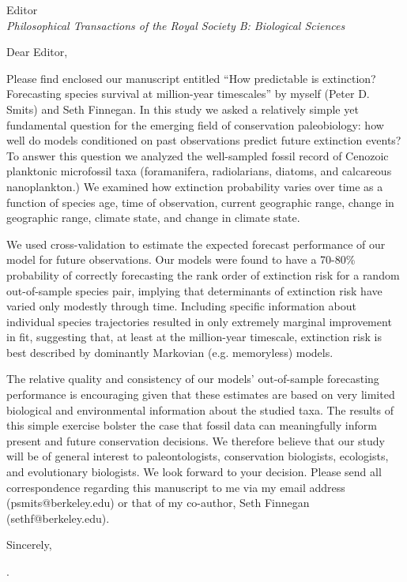 \documentclass{letter}
\begin{document}
\begin{letter}{Editor \\ \textit{Philosophical Transactions of the Royal Society B: Biological Sciences}}
  \opening{Dear Editor,}


Please find enclosed our manuscript entitled ``How predictable is extinction? Forecasting species survival at million-year timescales'' by myself (Peter D. Smits) and Seth Finnegan. In this study we asked a relatively simple yet fundamental question for the emerging field of conservation paleobiology: how well do models conditioned on past observations predict future extinction events? To answer this question we analyzed the well-sampled fossil record of Cenozoic planktonic microfossil taxa (foramanifera, radiolarians, diatoms, and calcareous nanoplankton.) We examined how extinction probability varies over time as a function of species age, time of observation, current geographic range, change in geographic range, climate state, and change in climate state.

We used cross-validation to estimate the expected forecast performance of our model for future observations. Our models were found to have a 70-80\% probability of correctly forecasting the rank order of extinction risk for a random out-of-sample species pair, implying that determinants of extinction risk have varied only modestly through time. Including specific information about individual species trajectories resulted in only extremely marginal improvement in fit, suggesting that, at least at the million-year timescale, extinction risk is best described by dominantly Markovian (e.g. memoryless) models.

The relative quality and consistency of our models’ out-of-sample forecasting performance is encouraging given that these estimates are based on very limited biological and environmental information about the studied taxa. The results of this simple exercise bolster the case that fossil data can meaningfully inform present and future conservation decisions. We therefore believe that our study will be of general interest to paleontologists, conservation biologists, ecologists, and evolutionary biologists.  We look forward to your decision. Please send all correspondence regarding this manuscript to me via my email address (psmits@berkeley.edu) or that of my co-author, Seth Finnegan (sethf@berkeley.edu).

  \closing{Sincerely,}

  .

\end{letter}
\end{document}
